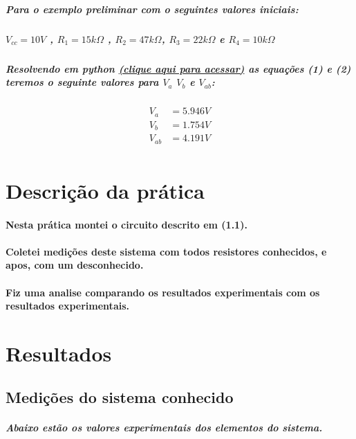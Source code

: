 \documentclass[12pt,twoside, a4paper, twocolumn]{article}
\begin{document}
\subparagraph*{Para o exemplo preliminar com o seguintes valores iniciais: }
\subparagraph*{$V_{cc} = 10V$ , $R_1 = 15k\varOmega$ , $R_2 = 47k\varOmega$, $R_3 = 22k\varOmega$ e $R_4 = 10k\varOmega$}

\subparagraph*{Resolvendo em python \href{https://www.online-python.com/AkfwEsRGU9}{(clique aqui para acessar)} as equações (1) e (2) teremos o seguinte valores para $V_{a}$  $V_b$ e $V_{ab}$:}

\begin{equation*}
    \begin{aligned}
        V_{a}  & = 5.946V \\
        V_{b}  & = 1.754V \\
        V_{ab} & = 4.191V \\
    \end{aligned}
\end{equation*}


\section{Descrição da prática}

\paragraph*{Nesta prática montei o circuito descrito em (1.1). }

\paragraph*{Coletei medições deste sistema com todos resistores conhecidos, e apos, com um desconhecido.}
\paragraph*{Fiz uma analise comparando os resultados experimentais com os resultados experimentais.}



\section{Resultados}

\subsection{Medições do sistema conhecido}

\subparagraph*{Abaixo estão os valores experimentais dos elementos do sistema.}
\end{document}
